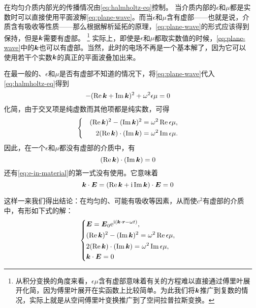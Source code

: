\documentclass[UTF8, a4paper]{ctexart}
\newcommand*{\ii}{\mathrm{i}}
\newcommand*{\ee}{\mathrm{e}}
\newenvironment{bigcase}{\left\{\quad\begin{aligned}}{\end{aligned}\right.}
\begin{document}
在均匀介质内部光的传播情况由\eqref{eq:halmholtz-eq}控制。
当介质内部的$\epsilon$和$\mu$都是实数时可以直接使用平面波解\eqref{eq:plane-wave}。而当$\epsilon$和$\mu$含有虚部——也就是说，介质含有吸收等性质——那么根据解析延拓的原理，\eqref{eq:plane-wave}的形式应该得到保持，但是$\vb*{k}$需要有虚部。%
\footnote{从积分变换的角度来看，$\epsilon\mu$含有虚部意味着有关的方程难以直接通过傅里叶展开化简，因为傅里叶展开在实函数上比较简单。为此我们将$\vb*{k}$推广到复数的情况，实际上就是从空间傅里叶变换推广到了空间拉普拉斯变换。}
实际上，即使是$\epsilon$和$\mu$都取实数值的时候，\eqref{eq:plane-wave}中的$\vb*{k}$也可以有虚部。当然，此时的电场不再是一个基本解了，因为它可以使用若干个实数$\vb*{k}$的真正的平面波叠加出来。

在最一般的、$\epsilon$和$\mu$是否有虚部不知道的情况下，将\eqref{eq:plane-wave}代入\eqref{eq:halmholtz-eq}得到
\[
    - (\Re \vb*{k} + \Im \vb*{k})^2 + \omega^2 \epsilon\mu = 0
\]
化简，由于交叉项是纯虚数而其他项都是纯实数，可得
\[
    \begin{bigcase}
        (\Re \vb*{k})^2 - (\Im \vb*{k})^2 &= \omega^2\Re \epsilon\mu, \\
        2 (\Re \vb*{k}) \cdot (\Im \vb*{\vb*{k}}) &= \omega^2\Im \epsilon\mu.
    \end{bigcase}
\]
因此，在一个$\epsilon$和$\mu$都没有虚部的介质中，有
\[
    (\Re \vb*{k}) \cdot (\Im \vb*{\vb*{k}}) = 0
\]
还有\eqref{eq:e-in-material}的第一式没有使用。它意味着
\[
    \vb*{k} \cdot \vb*{E} = (\Re \vb*{k} + \ii \Im \vb*{k}) \cdot \vb*{E} = 0
\]

这样一来我们得出结论：在均匀的、可能有吸收等因素，从而使$c^2$有虚部的介质中，有形如下式的解：
\begin{equation}
    \left\{
        \begin{aligned}
            &\vb*{E} = \vb*{E}_0 \ee^{\ii (\vb*{k} \cdot \vb*{r} - \omega t)}, \\
            &(\Re \vb*{k})^2 - (\Im \vb*{k})^2 = \omega^2 \Re \epsilon\mu, \\
            &2 (\Re \vb*{k}) \cdot (\Im \vb*{\vb*{k}}) = \omega^2 \Im \epsilon\mu, \\
            &\vb*{k} \cdot \vb*{E} = 0
        \end{aligned}
    \right.
    \label{eq:uniform-wave}
\end{equation}
\end{document}

